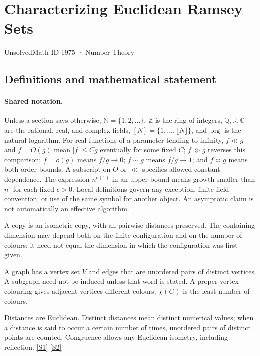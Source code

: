 \documentclass[11pt,a4paper]{article}
\newcommand{\N}{\mathbb{N}}
\newcommand{\Z}{\mathbb{Z}}
\newcommand{\Q}{\mathbb{Q}}
\newcommand{\R}{\mathbb{R}}
\newcommand{\C}{\mathbb{C}}
\newcommand{\sref}[2]{\hyperlink{source:#1:#2}{[S#2]}}
\begin{document}

\setcounter{section}{1974}

\section{Characterizing Euclidean Ramsey Sets}\label{1975}

{\small\sffamily UnsolvedMath ID 1975 · Number Theory}

\subsection{Definitions and mathematical statement}

\paragraph{Shared notation.}Unless a section says otherwise, $\N=\{1,2,\ldots\}$,
$\Z$ is the ring of integers, $\Q,\R,\C$ are the rational, real, and complex
fields, $[N]=\{1,\ldots,\lfloor N\rfloor\}$, and $\log$ is the natural
logarithm. For real functions of a parameter tending to infinity,
$f\ll g$ and $f=O(g)$ mean $|f|\leq Cg$ eventually for some fixed $C$;
$f\gg g$ reverses this comparison; $f=o(g)$ means $f/g\to0$;
$f\sim g$ means $f/g\to1$; and $f\asymp g$ means both order bounds.
A subscript on $O$ or $\ll$ specifies allowed constant dependence.
The expression $n^{o(1)}$ in an upper bound means growth smaller than
$n^\epsilon$ for each fixed $\epsilon>0$. Local definitions govern any
exception, finite-field convention, or use of the same symbol for another
object. An asymptotic claim is not automatically an effective algorithm.



A copy is an isometric copy, with all pairwise distances preserved. The containing dimension may depend both on the finite configuration and on the number of colours; it need not equal the dimension in which the configuration was first given.

A graph has a vertex set $V$ and edges that are unordered pairs of distinct vertices. A subgraph need not be induced unless that word is stated. A proper vertex colouring gives adjacent vertices different colours; $\chi(G)$ is the least number of colours.

Distances are Euclidean. Distinct distances mean distinct numerical values; when a distance is said to occur a certain number of times, unordered pairs of distinct points are counted. Congruence allows any Euclidean isometry, including reflection. \sref{1975}{1} \sref{1975}{2}
\end{document}
